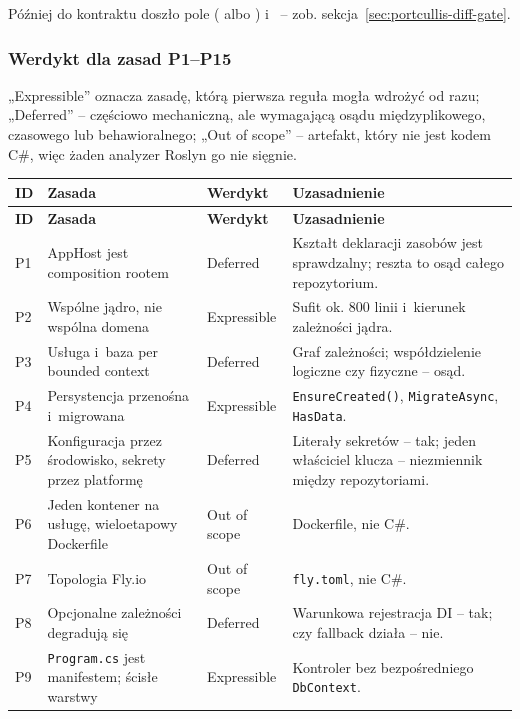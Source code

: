 Później do kontraktu doszło pole  ( albo
) i~ -- zob. sekcja~\ref{sec:portcullis-diff-gate}.

\subsubsection{Werdykt dla zasad P1--P15}

„Expressible” oznacza zasadę, którą pierwsza reguła mogła wdrożyć od razu; „Deferred” --
częściowo mechaniczną, ale wymagającą osądu międzyplikowego, czasowego lub behawioralnego;
„Out of scope” -- artefakt, który nie jest kodem C\#, więc żaden analyzer Roslyn go nie
sięgnie.

\begin{xltabular}{\linewidth}{@{}l >{\raggedright\arraybackslash}p{4.4cm} >{\raggedright\arraybackslash}p{2.0cm} >{\raggedright\arraybackslash}X@{}}
\toprule
\textbf{ID} & \textbf{Zasada} & \textbf{Werdykt} & \textbf{Uzasadnienie} \\
\midrule
\endfirsthead
\toprule
\textbf{ID} & \textbf{Zasada} & \textbf{Werdykt} & \textbf{Uzasadnienie} \\
\midrule
\endhead
P1 & AppHost jest composition rootem & Deferred & Kształt deklaracji zasobów jest sprawdzalny; reszta to osąd całego repozytorium. \\
P2 & Wspólne jądro, nie wspólna domena & Expressible & Sufit ok. 800 linii i~kierunek zależności jądra. \\
P3 & Usługa i~baza per bounded context & Deferred & Graf zależności; współdzielenie logiczne czy fizyczne -- osąd. \\
P4 & Persystencja przenośna i~migrowana & Expressible & \texttt{EnsureCreated()}, \texttt{MigrateAsync}, \texttt{HasData}. \\
P5 & Konfiguracja przez środowisko, sekrety przez platformę & Deferred & Literały sekretów -- tak; jeden właściciel klucza -- niezmiennik między repozytoriami. \\
P6 & Jeden kontener na usługę, wieloetapowy Dockerfile & Out of scope & Dockerfile, nie C\#. \\
P7 & Topologia Fly.io & Out of scope & \texttt{fly.toml}, nie C\#. \\
P8 & Opcjonalne zależności degradują się & Deferred & Warunkowa rejestracja DI -- tak; czy fallback działa -- nie. \\
P9 & \texttt{Program.cs} jest manifestem; ścisłe warstwy & Expressible & Kontroler bez bezpośredniego \texttt{DbContext}. \\

\end{xltabular}
